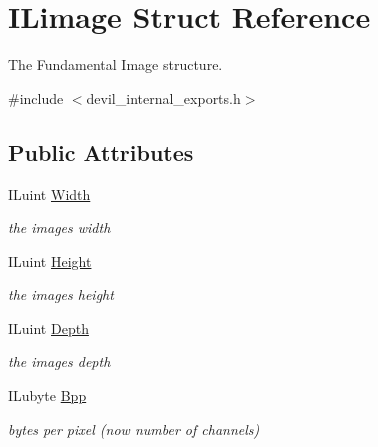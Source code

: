 \hypertarget{structILimage}{}\section{I\+Limage Struct Reference}
\label{structILimage}


The Fundamental Image structure.  




{\ttfamily \#include $<$devil\+\_\+internal\+\_\+exports.\+h$>$}

\subsection*{Public Attributes}
\begin{DoxyCompactItemize}
\item 
\mbox{\label{structILimage_acdaccde79cda12c44c7a076ef9978cf1}} 
I\+Luint \hyperlink{structILimage_acdaccde79cda12c44c7a076ef9978cf1}{Width}
\begin{DoxyCompactList}\small\item\em the image\textquotesingle{}s width \end{DoxyCompactList}\item 
\mbox{\label{structILimage_af0fe112b929d774c723ba5d8b6c2c5da}} 
I\+Luint \hyperlink{structILimage_af0fe112b929d774c723ba5d8b6c2c5da}{Height}
\begin{DoxyCompactList}\small\item\em the image\textquotesingle{}s height \end{DoxyCompactList}\item 
\mbox{\label{structILimage_a00e19fb6f1e50731d114c302129112d9}} 
I\+Luint \hyperlink{structILimage_a00e19fb6f1e50731d114c302129112d9}{Depth}
\begin{DoxyCompactList}\small\item\em the image\textquotesingle{}s depth \end{DoxyCompactList}\item 
\mbox{\label{structILimage_a1b3ec86e5bf7087b7d46f0ed61d86eb9}} 
I\+Lubyte \hyperlink{structILimage_a1b3ec86e5bf7087b7d46f0ed61d86eb9}{Bpp}
\begin{DoxyCompactList}\small\item\em bytes per pixel (now number of channels) \end{DoxyCompactList}\item 

\end{DoxyCompactItemize}
